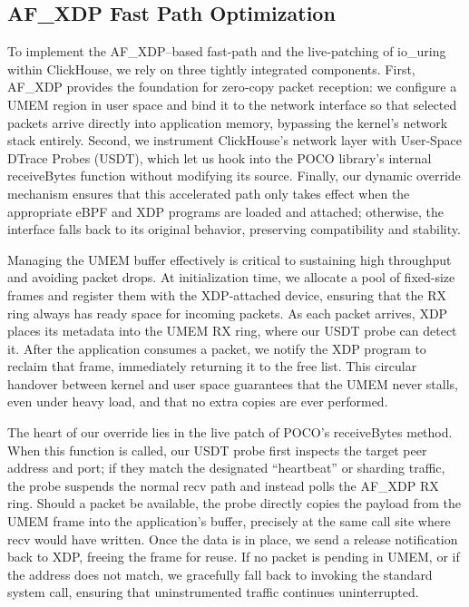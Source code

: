 \documentclass[sigconf,10pt]{acmart}
\begin{document}
\subsection{AF\_XDP Fast Path Optimization}
To implement the AF\_XDP–based fast‐path and the live‐patching of io\_uring within ClickHouse, we rely on three tightly integrated components. First, AF\_XDP provides the foundation for zero‐copy packet reception: we configure a UMEM region in user space and bind it to the network interface so that selected packets arrive directly into application memory, bypassing the kernel’s network stack entirely. Second, we instrument ClickHouse’s network layer with User‐Space DTrace Probes (USDT), which let us hook into the POCO library’s internal receiveBytes function without modifying its source. Finally, our dynamic override mechanism ensures that this accelerated path only takes effect when the appropriate eBPF and XDP programs are loaded and attached; otherwise, the interface falls back to its original behavior, preserving compatibility and stability.

Managing the UMEM buffer effectively is critical to sustaining high throughput and avoiding packet drops. At initialization time, we allocate a pool of fixed-size frames and register them with the XDP‐attached device, ensuring that the RX ring always has ready space for incoming packets. As each packet arrives, XDP places its metadata into the UMEM RX ring, where our USDT probe can detect it. After the application consumes a packet, we notify the XDP program to reclaim that frame, immediately returning it to the free list. This circular handover between kernel and user space guarantees that the UMEM never stalls, even under heavy load, and that no extra copies are ever performed.

The heart of our override lies in the live patch of POCO’s receiveBytes method. When this function is called, our USDT probe first inspects the target peer address and port; if they match the designated “heartbeat” or sharding traffic, the probe suspends the normal recv path and instead polls the AF\_XDP RX ring. Should a packet be available, the probe directly copies the payload from the UMEM frame into the application’s buffer, precisely at the same call site where recv would have written. Once the data is in place, we send a release notification back to XDP, freeing the frame for reuse. If no packet is pending in UMEM, or if the address does not match, we gracefully fall back to invoking the standard system call, ensuring that uninstrumented traffic continues uninterrupted.
\end{document}
